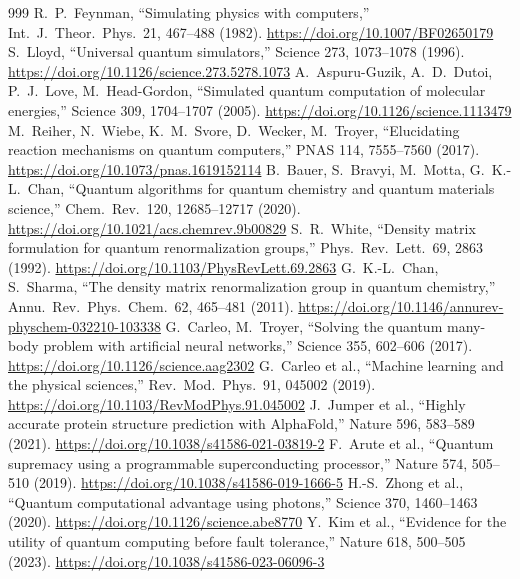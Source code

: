 
\begin{thebibliography}{999}\small
\setlength{\itemsep}{1pt}
 R.~P.~Feynman, ``Simulating physics with computers,'' Int.\ J.\ Theor.\ Phys.\ 21, 467--488 (1982). \url{https://doi.org/10.1007/BF02650179}
 S.~Lloyd, ``Universal quantum simulators,'' Science 273, 1073--1078 (1996). \url{https://doi.org/10.1126/science.273.5278.1073}
 A.~Aspuru-Guzik, A.~D.~Dutoi, P.~J.~Love, M.~Head-Gordon, ``Simulated quantum computation of molecular energies,'' Science 309, 1704--1707 (2005). \url{https://doi.org/10.1126/science.1113479}
 M.~Reiher, N.~Wiebe, K.~M.~Svore, D.~Wecker, M.~Troyer, ``Elucidating reaction mechanisms on quantum computers,'' PNAS 114, 7555--7560 (2017). \url{https://doi.org/10.1073/pnas.1619152114}
 B.~Bauer, S.~Bravyi, M.~Motta, G.~K.-L.~Chan, ``Quantum algorithms for quantum chemistry and quantum materials science,'' Chem.\ Rev.\ 120, 12685--12717 (2020). \url{https://doi.org/10.1021/acs.chemrev.9b00829}
 S.~R.~White, ``Density matrix formulation for quantum renormalization groups,'' Phys.\ Rev.\ Lett.\ 69, 2863 (1992). \url{https://doi.org/10.1103/PhysRevLett.69.2863}
 G.~K.-L.~Chan, S.~Sharma, ``The density matrix renormalization group in quantum chemistry,'' Annu.\ Rev.\ Phys.\ Chem.\ 62, 465--481 (2011). \url{https://doi.org/10.1146/annurev-physchem-032210-103338}
 G.~Carleo, M.~Troyer, ``Solving the quantum many-body problem with artificial neural networks,'' Science 355, 602--606 (2017). \url{https://doi.org/10.1126/science.aag2302}
 G.~Carleo et al., ``Machine learning and the physical sciences,'' Rev.\ Mod.\ Phys.\ 91, 045002 (2019). \url{https://doi.org/10.1103/RevModPhys.91.045002}
 J.~Jumper et al., ``Highly accurate protein structure prediction with AlphaFold,'' Nature 596, 583--589 (2021). \url{https://doi.org/10.1038/s41586-021-03819-2}
 F.~Arute et al., ``Quantum supremacy using a programmable superconducting processor,'' Nature 574, 505--510 (2019). \url{https://doi.org/10.1038/s41586-019-1666-5}
 H.-S.~Zhong et al., ``Quantum computational advantage using photons,'' Science 370, 1460--1463 (2020). \url{https://doi.org/10.1126/science.abe8770}
 Y.~Kim et al., ``Evidence for the utility of quantum computing before fault tolerance,'' Nature 618, 500--505 (2023). \url{https://doi.org/10.1038/s41586-023-06096-3}

\end{thebibliography}
